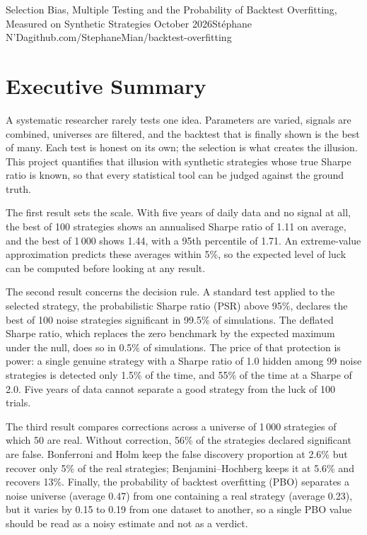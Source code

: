 \documentclass[11pt,a4paper,oneside]{report}
\begin{document}
{Selection Bias, Multiple Testing and the Probability of Backtest Overfitting, Measured on Synthetic Strategies}
{October 2026}{Stéphane N'Da}{github.com/StephaneMian/backtest-overfitting}

\chapter*{Executive Summary}
\thispagestyle{plain}

A systematic researcher rarely tests one idea. Parameters are varied, signals are combined, universes are filtered, and the backtest that is finally shown is the best of many. Each test is honest on its own; the selection is what creates the illusion. This project quantifies that illusion with synthetic strategies whose true Sharpe ratio is known, so that every statistical tool can be judged against the ground truth.

The first result sets the scale. With five years of daily data and no signal at all, the best of 100 strategies shows an annualised Sharpe ratio of 1.11 on average, and the best of 1\,000 shows 1.44, with a 95th percentile of 1.71. An extreme-value approximation predicts these averages within 5\%, so the expected level of luck can be computed before looking at any result.

The second result concerns the decision rule. A standard test applied to the selected strategy, the probabilistic Sharpe ratio (PSR) above 95\%, declares the best of 100 noise strategies significant in 99.5\% of simulations. The deflated Sharpe ratio, which replaces the zero benchmark by the expected maximum under the null, does so in 0.5\% of simulations. The price of that protection is power: a single genuine strategy with a Sharpe ratio of 1.0 hidden among 99 noise strategies is detected only 1.5\% of the time, and 55\% of the time at a Sharpe of 2.0. Five years of data cannot separate a good strategy from the luck of 100 trials.

The third result compares corrections across a universe of 1\,000 strategies of which 50 are real. Without correction, 56\% of the strategies declared significant are false. Bonferroni and Holm keep the false discovery proportion at 2.6\% but recover only 5\% of the real strategies; Benjamini--Hochberg keeps it at 5.6\% and recovers 13\%. Finally, the probability of backtest overfitting (PBO) separates a noise universe (average 0.47) from one containing a real strategy (average 0.23), but it varies by 0.15 to 0.19 from one dataset to another, so a single PBO value should be read as a noisy estimate and not as a verdict.
\end{document}
